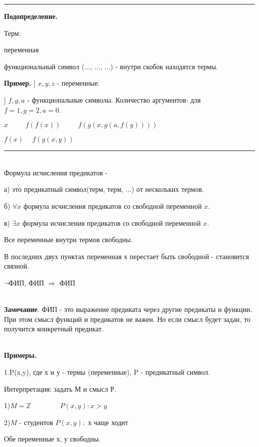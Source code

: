\documentclass{article}
\begin{document}
\noindent\rule{\textwidth}{0.01pt}
\textbf{Подопределение.}

Терм:

\hspace{10 pt}переменная

\hspace{10 pt}функциональный символ (..., ..., ...) - внутри скобок находятся термы.

\noindent\textbf{Пример.} ] $x, y, z $ - переменные.

] $f, g, a $ - функциональные символы. Количество аргументов: для $f = 1, g=2, a=0$.

$x \hspace{30pt} f(f(x)) \hspace{30pt} f(g(x,g(a,f(y))))$

$f(x) \hspace{15pt} f(g(x,y))$

\noindent\rule{\textwidth}{0.01pt}

~\\
Формула исчисления предикатов - 

а) это предикатный символ(терм, терм, ...) от нескольких термов.

б) $\forall x$ формула исчисления предикатов со свободной переменной $x$.

в) $\exists x$ формула исчисления предикатов со свободной переменной $x$.

Все переменные внутри термов свободны.

В последних двух пунктах переменная х перестает быть свободной - становится связной.

$\neg$ФИП, ФИП $\Rightarrow$ ФИП

~\\
\textbf{Замечание}. ФИП - это выражение предиката через другие предикаты и функции. При этом смысл функций и предикатов не важен. Но если смысл будет задан, то получится конкретный предикат.

~\\
\textbf{Примеры. }

\noindent 1.P(x,y), где х и у - термы (переменные), P - предикатный символ.

Интерпретация: задать М и смысл Р.

1)$M=\mathds{Z} \hspace{50pt} P(x,y): x>y$

2)$M$ - студентов \hspace{10pt} $P(x,y):$ х чаще ходит

Обе переменные х, у свободны.
\end{document}
